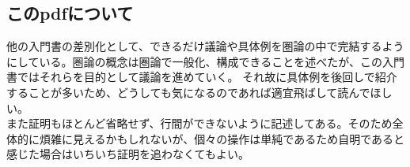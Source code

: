 \subsection{このpdfについて}\label{chap-1.1-about-this-pdf}
他の入門書の差別化として、できるだけ議論や具体例を圏論の中で完結するようにしている。圏論の概念は圏論で一般化、構成できることを述べたが、この入門書ではそれらを目的として議論を進めていく。
それ故に具体例を後回しで紹介することが多いため、どうしても気になるのであれば適宜飛ばして読んでほしい。\\
また証明もほとんど省略せず、行間ができないように記述してある。そのため全体的に煩雑に見えるかもしれないが、個々の操作は単純であるため自明であると感じた場合はいちいち証明を追わなくてもよい。\\